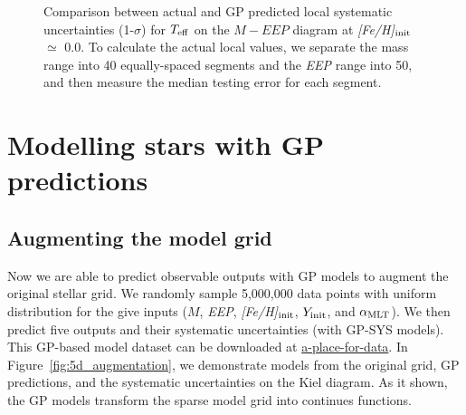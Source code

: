 \begin{figure}
    \caption{Comparison between actual and GP predicted local systematic uncertainties (1-$\sigma$) for $T_{\rm eff}$ on the $M - EEP$ diagram at {\it [Fe/H]}$_{\rm init}$ $\simeq$ 0.0. To calculate the actual local values, we separate the mass range into 40 equally-spaced segments and the {\it EEP} range into 50, and then measure the median testing error for each segment. } 
  \label{fig:5d_sys_teff}
\end{figure}



\section{Modelling stars with GP predictions}\label{sec:augmentation}


\subsection{Augmenting the model grid}

Now we are able to predict observable outputs with GP models to augment the original stellar grid. We randomly sample 5,000,000 data points with uniform distribution for the give inputs ($M$, {\it EEP}, {\it [Fe/H]}$_{\rm init}$, $Y_{\rm init}$, and $\alpha_{\rm MLT}$). We then predict five outputs and their systematic uncertainties (with GP-SYS models). This GP-based model dataset can be downloaded at \url{a-place-for-data}. In Figure~\ref{fig:5d_augmentation}, we demonstrate models from the original grid, GP predictions, and the systematic uncertainties on the Kiel diagram. As it shown, the GP models transform the sparse model grid into continues functions. 

